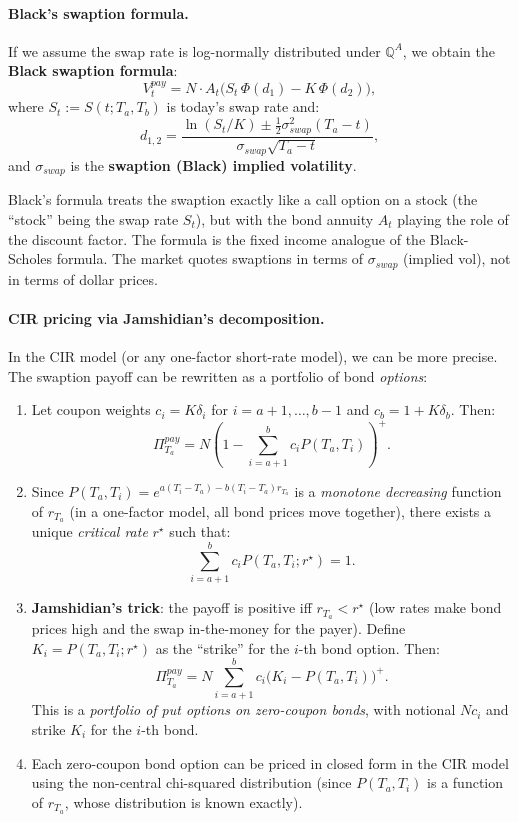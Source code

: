 \documentclass[11pt]{article}
\newcommand{\QQ}{\mathbb{Q}}
\begin{document}
\paragraph{Black's swaption formula.}

If we assume the swap rate is log-normally distributed under $\QQ^A$,
we obtain the \textbf{Black swaption formula}:
\[
V_t^{pay}
= N\cdot A_t\Big(S_t\,\Phi(d_1) - K\,\Phi(d_2)\Big),
\]
where $S_t := S(t;T_a,T_b)$ is today's swap rate and:
\[
d_{1,2}
= \frac{\ln(S_t/K) \pm \frac{1}{2}\sigma_{swap}^2(T_a-t)}
{\sigma_{swap}\sqrt{T_a-t}},
\]
and $\sigma_{swap}$ is the \textbf{swaption (Black) implied volatility}.

\begin{intuition}
Black's formula treats the swaption exactly like a call option on a stock
(the ``stock'' being the swap rate $S_t$), but with the bond annuity $A_t$
playing the role of the discount factor.  The formula is the fixed income
analogue of the Black-Scholes formula.  The market quotes swaptions in
terms of $\sigma_{swap}$ (implied vol), not in terms of dollar prices.
\end{intuition}

\paragraph{CIR pricing via Jamshidian's decomposition.}

In the CIR model (or any one-factor short-rate model), we can be more
precise.  The swaption payoff can be rewritten as a portfolio of bond
\emph{options}:

\begin{enumerate}
  \item Let coupon weights $c_i = K\delta_i$ for $i=a+1,\ldots,b-1$ and
  $c_b = 1 + K\delta_b$.  Then:
  \[
  \Pi_{T_a}^{pay}
  = N\left(1 - \sum_{i=a+1}^b c_i P(T_a,T_i)\right)^+.
  \]

  \item Since $P(T_a,T_i) = e^{a(T_i-T_a)-b(T_i-T_a)r_{T_a}}$ is a
  \emph{monotone decreasing} function of $r_{T_a}$ (in a one-factor model,
  all bond prices move together), there exists a unique \emph{critical rate}
  $r^\star$ such that:
  \[
  \sum_{i=a+1}^b c_i P(T_a,T_i;r^\star) = 1.
  \]

  \item \textbf{Jamshidian's trick}: the payoff is positive iff
  $r_{T_a} < r^\star$ (low rates make bond prices high and the swap
  in-the-money for the payer).  Define $K_i = P(T_a,T_i;r^\star)$ as the
  ``strike'' for the $i$-th bond option.  Then:
  \[
  \Pi_{T_a}^{pay}
  = N\sum_{i=a+1}^b c_i\Big(K_i - P(T_a,T_i)\Big)^+.
  \]
  This is a \emph{portfolio of put options on zero-coupon bonds}, with
  notional $Nc_i$ and strike $K_i$ for the $i$-th bond.

  \item Each zero-coupon bond option can be priced in closed form in the
  CIR model using the non-central chi-squared distribution (since
  $P(T_a,T_i)$ is a function of $r_{T_a}$, whose distribution is known
  exactly).
\end{enumerate}
\end{document}
